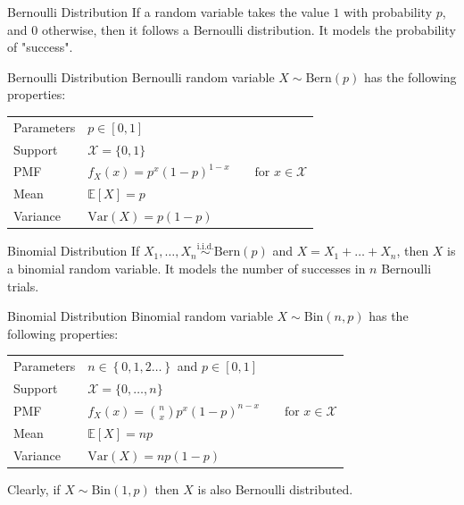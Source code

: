 \documentclass[10pt]{beamer}
\begin{document}
\begin{frame}[fragile]{Bernoulli Distribution}
If a random variable takes the value \(1\) with probability \(p\), and \(0\) otherwise, then it follows a Bernoulli distribution. It models the probability of "success".

\begin{alertblock}{Bernoulli Distribution}
Bernoulli random variable \(X \sim \textrm{Bern}\left(p\right)\) has the following properties:
  \begin{table}
    \begin{tabular}{ll}
      \toprule
      Parameters & \(p \in \left[0,1\right]\)\\
      Support & \(\mathcal{X} = \{0,1\}\)\\
      PMF & \(f_X\left(x\right) = p^x\left(1 - p\right)^{1 - x}\qquad\textrm{for }x \in \mathcal{X}\)\\
      Mean & \(\mathbb{E}\left[X\right] = p\)\\
      Variance & \(\textrm{Var}\left(X\right) = p\left(1 - p\right)\)\\
      \bottomrule
    \end{tabular}
  \end{table}
\end{alertblock}
\end{frame}

\begin{frame}[fragile]{Binomial Distribution}
If \(X_1, \dots, X_n \overset{\textrm{i.i.d.}}{\sim} \textrm{Bern}\left(p\right)\) and \(X = X_1 + \dots + X_n\), then \(X\) is a binomial random variable. It models the number of successes in \(n\) Bernoulli trials.

\begin{alertblock}{Binomial Distribution}
Binomial random variable \(X \sim \textrm{Bin}\left(n, p\right)\) has the following properties:
  \begin{table}
    \begin{tabular}{ll}
      \toprule
      Parameters & \(n \in \left\{0, 1, 2 \dots\right\}\) and \(p \in \left[0,1\right]\)\\
      Support & \(\mathcal{X} = \{0,\dots, n\}\)\\
      PMF & \(f_X\left(x\right) = \binom{n}{x}p^x\left(1 - p\right)^{n - x}\qquad\textrm{for }x \in \mathcal{X}\)\\
      Mean & \(\mathbb{E}\left[X\right] = np\)\\
      Variance & \(\textrm{Var}\left(X\right) = np\left(1 - p\right)\)\\
      \bottomrule
    \end{tabular}
  \end{table}
\end{alertblock}

Clearly, if \(X \sim \textrm{Bin}\left(1, p\right)\) then \(X\) is also Bernoulli distributed.
\end{frame}
\end{document}
